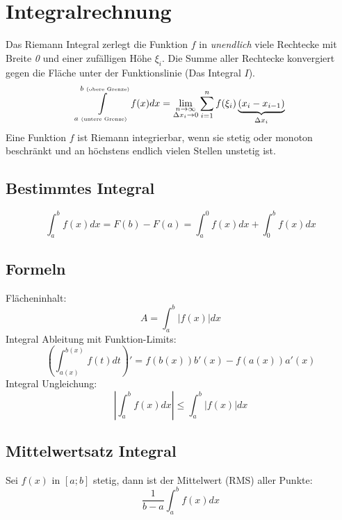 \section{Integralrechnung}
Das Riemann Integral zerlegt die Funktion $f$ in \textit{unendlich} viele Rechtecke mit Breite \textit{0} und einer zufälligen Höhe $\xi_i$. Die Summe aller Rechtecke konvergiert gegen die Fläche unter der Funktionslinie (Das Integral $I$).
\[
\int\limits_{a \text{ \tiny(untere Grenze)}}^{b \text{ \tiny(obere Grenze)}}f(x)dx = \lim_{\substack{n\to\infty\\\Delta x_i\to 0}} \sum\limits_{i = 1}^{n}f(\xi_i)\underbrace{(x_i - x_{i-1})}_{\Delta x_i}
\]
\noindent Eine Funktion $f$ ist Riemann integrierbar, wenn sie stetig oder monoton beschränkt und an höchstens endlich vielen Stellen unstetig ist.

\subsection{Bestimmtes Integral}
\[\int_{a}^{b}f(x)dx = F(b) - F(a) = \int_{a}^{0}f(x)dx + \int_{0}^{b}f(x)dx\]

\subsection{Formeln}
\noindent Flächeninhalt: \[A = \int_{a}^{b}\left|f(x)\right|dx\]
\noindent Integral Ableitung mit Funktion-Limits: \[\left(\int_{a(x)}^{b(x)}f(t)dt\right)' = f(b(x))b'(x) - f(a(x))a'(x)\]
\noindent Integral Ungleichung:
\[\left|\int_{a}^{b}f(x)dx\right| \leq \int_{a}^{b}\left|f(x)\right|dx\]

\subsection{Mittelwertsatz Integral}
Sei $f(x)$ in $[a;b]$ stetig, dann ist der Mittelwert (RMS) aller Punkte:
\[\frac{1}{b-a}\int_{a}^{b}f(x)dx\]

